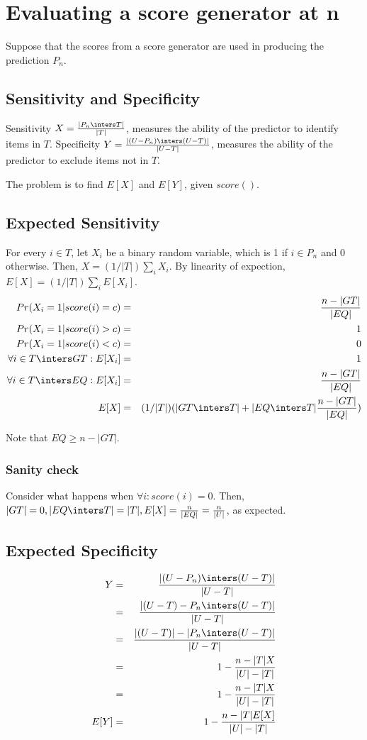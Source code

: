 \documentclass{article}
\begin{document}
\section{Evaluating a score generator at n}
Suppose that the scores from a score generator are used in producing the prediction $P_n$. 

\subsection{Sensitivity and Specificity}
Sensitivity $X = \frac{|P_n \inters T|}{|T|}$, measures the ability of the predictor to identify items in $T$. Specificity $Y = \frac{|(U - P_n) \inters (U - T)|}{|U - T|}$, measures the ability of the predictor to exclude items not in $T$.

The problem is to find $E[X]$ and $E[Y]$, given $score()$.

\subsection{Expected Sensitivity}
For every $i \in T$, let $X_i$ be a binary random variable, which is 1 if $i \in P_n$ and 0 otherwise. Then, $X = (1/|T|)\sum_i{X_i}$. By linearity of expection, $E[X] = (1/|T|)\sum_i{E[X_i]}$.
\begin{eqnarray*}
 Pr(X_i = 1|score(i)=c) &=& \frac{n-|GT|}{|EQ|} \\
 Pr(X_i = 1|score(i)>c) &=& 1 \\
 Pr(X_i = 1|score(i)<c) &=& 0 \\
 \forall i \in T \inters GT: E[X_i] &=& 1 \\
 \forall i \in T \inters EQ: E[X_i] &=& \frac{n-|GT|}{|EQ|} \\
 E[X] &=& (1/|T|)( |GT \inters T| + |EQ \inters T|\frac{n-|GT|}{|EQ|})\\
\end{eqnarray*}

Note that $EQ \geq n - |GT|$.

\subsubsection{Sanity check}
Consider what happens when $\forall i: score(i) = 0$. Then, $|GT| = 0, |EQ \inters T| = |T|, E[X] = \frac{n}{|EQ|} = \frac{n}{|U|}$, as expected.

\subsection{Expected Specificity}
\begin{eqnarray*}
Y &=& \frac{|(U - P_n) \inters (U - T)|}{|U - T|}\\
&=& \frac{|(U - T) - P_n \inters (U - T)|}{|U - T|}\\
&=& \frac{|(U - T)| - |P_n \inters (U - T)|}{|U - T|}\\
&=& 1 - \frac{n - |T|X}{|U| - |T|}\\
&=& 1 - \frac{n - |T|X}{|U| - |T|}\\
E[Y] &=& 1 - \frac{n - |T|E[X]}{|U| - |T|}\\
\end{eqnarray*}
\end{document}
